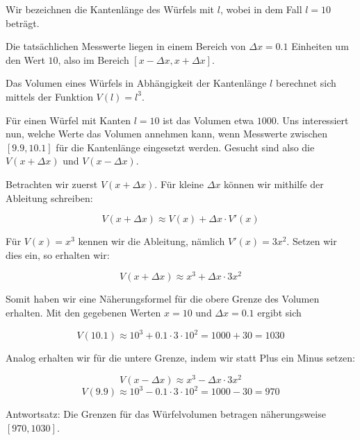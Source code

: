 \item Wir bezeichnen die Kantenlänge des Würfels mit $l$, wobei in dem Fall $l=10$ beträgt.

Die tatsächlichen Messwerte liegen in einem Bereich von $\Delta x = 0.1$ Einheiten um den Wert $10$, also im Bereich $[x-\Delta x, x + \Delta x]$.

Das Volumen eines Würfels in Abhängigkeit der Kantenlänge $l$ berechnet sich mittels der Funktion $V(l) = l^3$.

Für einen Würfel mit Kanten $l=10$ ist das Volumen etwa $1000$. Uns interessiert nun, welche Werte das Volumen annehmen kann,
wenn Messwerte zwischen $[9.9,10.1]$ für die Kantenlänge eingesetzt werden. Gesucht sind also die $V(x+\Delta x)$ und $V(x-\Delta x)$.

Betrachten wir zuerst $V(x+\Delta x)$. Für kleine $\Delta x$ können wir mithilfe der Ableitung schreiben:

$$V(x+\Delta x) \approx V(x) + \Delta x \cdot V'(x)$$

Für $V(x)=x^3$ kennen wir die Ableitung, nämlich $V'(x) = 3x^2$. Setzen wir dies ein, so erhalten wir:

$$V(x+\Delta x) \approx x^3 + \Delta x \cdot 3x^2$$

Somit haben wir eine Näherungsformel für die obere Grenze des Volumen erhalten. Mit den gegebenen Werten $x=10$ und $\Delta x = 0.1$ ergibt sich

$$V(10.1) \approx 10^3 + 0.1 \cdot 3 \cdot 10^2 = 1000 + 30  = 1030$$

Analog erhalten wir für die untere Grenze, indem wir statt Plus ein Minus setzen:

$$V(x-\Delta x) \approx x^3 - \Delta x \cdot 3x^2$$
$$V(9.9) \approx 10^3 - 0.1 \cdot 3 \cdot 10^2 = 1000 - 30  = 970$$

Antwortsatz: Die Grenzen für das Würfelvolumen betragen näherungsweise $[970, 1030]$.

